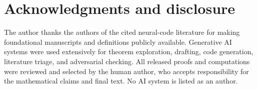 \section*{Acknowledgments and disclosure}
The author thanks the authors of the cited neural-code literature for making foundational manuscripts and definitions publicly available.  Generative AI systems were used extensively for theorem exploration, drafting, code generation, literature triage, and adversarial checking.  All released proofs and computations were reviewed and selected by the human author, who accepts responsibility for the mathematical claims and final text.  No AI system is listed as an author.
